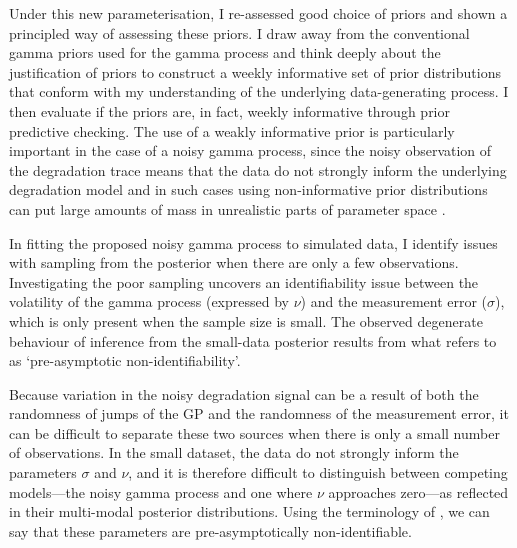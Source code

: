 Under this new parameterisation, I re-assessed good choice of priors and shown a principled way of assessing these priors. I draw away from the conventional gamma priors used for the gamma process and think deeply about the justification of priors to construct a weekly informative set of prior distributions that conform with my understanding of the underlying data-generating process. I then evaluate if the priors are, in fact, weekly informative through prior predictive checking. The use of a weakly informative prior is particularly important in the case of a noisy gamma process, since the noisy observation of the degradation trace means that the data do not strongly inform the underlying degradation model and in such cases using non-informative prior distributions can put large amounts of mass in unrealistic parts of parameter space \citep{tian2024}.

In fitting the proposed noisy gamma process to simulated data, I identify issues with sampling from the posterior when there are only a few observations. Investigating the poor sampling uncovers an identifiability issue between the volatility of the gamma process (expressed by $\nu$) and the measurement error ($\sigma$), which is only present when the sample size is small. The observed degenerate behaviour of inference from the small-data posterior results from what \citet{betancourt_2020} refers to as `pre-asymptotic non-identifiability'.

Because variation in the noisy degradation signal can be a result of both the randomness of jumps of the GP and the randomness of the measurement error, it can be difficult to separate these two sources when there is only a small number of observations. In the small dataset, the data do not strongly inform the parameters $\sigma$ and $\nu$, and it is therefore difficult to distinguish between competing models---the noisy gamma process and one where $\nu$ approaches zero---as reflected in their multi-modal posterior distributions. Using the terminology of \citet{betancourt_2020}, we can say that these parameters are pre-asymptotically non-identifiable.

